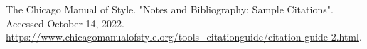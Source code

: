 \begin{thebibliography}{99}
\singlespace \normalsize

  The Chicago Manual of Style.
  "Notes and Bibliography: Sample Citations".
  Accessed October 14, 2022.
  \url{https://www.chicagomanualofstyle.org/tools_citationguide/citation-guide-2.html}.

\end{thebibliography}

